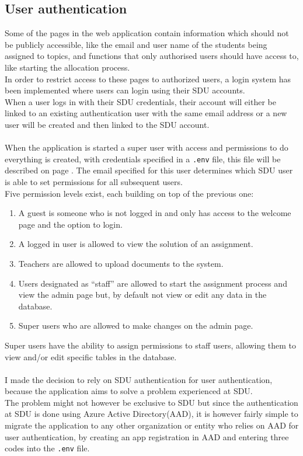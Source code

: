 \subsection{User authentication}\label{sec:login}
Some of the pages in the web application contain information which should not be publicly accessible, like the email and user name of the students being assigned to topics, and functions that only authorised users should have access to, like starting the allocation process.\\
In order to restrict access to these pages to authorized users, a login system has been implemented where users can login using their SDU accounts.\\
When a user logs in with their SDU credentials, their account will either be linked to an existing authentication user with the same email address or a new user will be created and then linked to the SDU account.\\\\
When the application is started a super user with access and permissions to do everything is created, with credentials specified in a \verb|.env| file, this file will be described on page  \pageref{sec:cont}. The email specified for this user determines which SDU user is able to set permissions for all subsequent users.\\
Five permission levels exist, each building on top of the previous one:
\begin{enumerate}
\item A guest is someone who is not logged in and only has access to the welcome page and the option to login.
\item A logged in user is allowed to view the solution of an assignment.
\item Teachers are allowed to upload documents to the system.
\item Users designated as ``staff'' are allowed to start the assignment process and view the admin page but, by default not view or edit any data in the database.
\item Super users who are allowed to make changes on the admin page.
\end{enumerate}
Super users have the ability to assign permissions to staff users, allowing them to view and/or edit specific tables in the database.\\\\
I made the decision to rely on SDU authentication for user authentication, because the application aims to solve a problem experienced at SDU.\\
The problem might not however be exclusive to SDU but since the authentication at SDU is done using Azure Active Directory(AAD), it is however fairly simple to migrate the application to any other organization or entity who relies on AAD for user authentication, by creating an app registration in AAD and entering three codes into the \verb|.env| file.